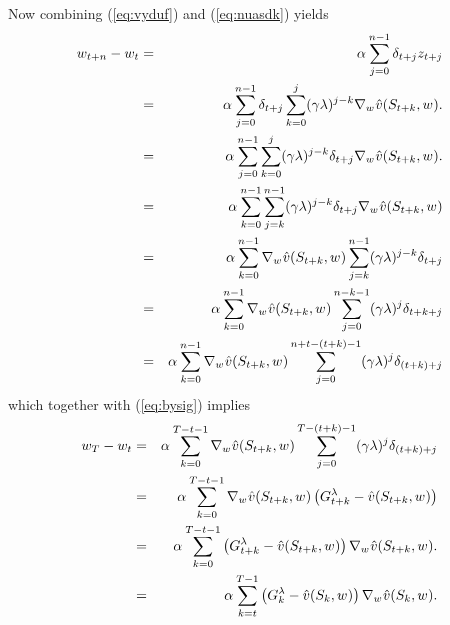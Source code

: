 Now combining (\ref{eq:vyduf}) and (\ref{eq:nuasdk}) yields
\begin{eqnarray*}
w_{t+n} - w_{t}
&=& \alpha_{} \sum_{j=0}^{n-1}  \delta_{t+j} z_{t+j}
\\
&=& \alpha_{} \sum_{j=0}^{n-1}  \delta_{t+j} 
\sum_{k=0}^j (\gamma \lambda)^{j-k} \nabla_{w_{}} \hat{v}(S_{t+k},w_{}).
\\
&=& \alpha_{} \sum_{j=0}^{n-1} \sum_{k=0}^j (\gamma \lambda)^{j-k}
\delta_{t+j} \nabla_{w_{}} \hat{v}(S_{t+k},w_{}).
\\
&=& \alpha_{} \sum_{k=0}^{n-1} \sum_{j=k}^{n-1} (\gamma \lambda)^{j-k}
\delta_{t+j} \nabla_{w_{}} \hat{v}(S_{t+k},w_{})
\\
&=& \alpha_{} \sum_{k=0}^{n-1} \nabla_{w_{}} \hat{v}(S_{t+k},w_{})
\sum_{j=k}^{n-1} (\gamma \lambda)^{j-k} \delta_{t+j}
\\
&=& \alpha_{} \sum_{k=0}^{n-1} \nabla_{w_{}} \hat{v}(S_{t+k},w_{})
\sum_{j=0}^{n-k-1} (\gamma \lambda)^{j} \delta_{t+k+j}
\\
&=& \alpha_{} \sum_{k=0}^{n-1} \nabla_{w_{}} \hat{v}(S_{t+k},w_{})
\sum_{j=0}^{n+t-(t+k)-1} (\gamma \lambda)^{j} \delta_{(t+k)+j}
\end{eqnarray*}
which together with (\ref{eq:bysig}) implies
\begin{eqnarray}
\nonumber
w_{T} - w_{t}
&=& \alpha_{} \sum_{k=0}^{T-t-1} \nabla_{w_{}} \hat{v}(S_{t+k},w_{})
\sum_{j=0}^{T-(t+k)-1} (\gamma \lambda)^{j} \delta_{(t+k)+j}
\\
\nonumber
&=& \alpha_{} \sum_{k=0}^{T-t-1} \nabla_{w_{}} \hat{v}(S_{t+k},w_{})
\left( G^{\lambda}_{t+k} - \hat{v}(S_{t+k}, w_{}) \right)
\\
\nonumber
&=& \alpha_{} \sum_{k=0}^{T-t-1}
\left( G^{\lambda}_{t+k} - \hat{v}(S_{t+k}, w_{}) \right)
\nabla_{w_{}} \hat{v}(S_{t+k},w_{}).
\\
&=& \alpha_{} \sum_{k=t}^{T-1}
\left( G^{\lambda}_{k} - \hat{v}(S_{k}, w_{}) \right)
\nabla_{w_{}} \hat{v}(S_{k},w_{}).
\label{eq:ishfg}
\end{eqnarray}

